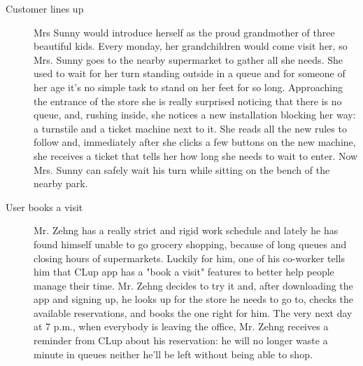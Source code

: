 \begin{description}
    \item[Customer lines up]
    Mrs Sunny would introduce herself as the proud grandmother of three beautiful kids.   
    Every monday, her grandchildren would come visit her, so  Mrs. Sunny goes to the nearby supermarket to gather all she needs. She used to wait for her turn standing outside in a queue and for someone of her age it's no simple task to stand on her feet for so long. Approaching the entrance of the store she is really surprised noticing that there is no queue, and, rushing inside, she notices a new installation blocking her way: a turnstile and a ticket machine next to it. She reads all the new rules to follow and, immediately after she clicks a few buttons on the new machine, she receives a ticket that tells her how long she needs to wait to enter. Now Mrs. Sunny can safely wait his turn while sitting on the bench of the nearby park. 


    \item[User books a visit]
    Mr. Zehng  has a really strict and rigid work schedule and lately he has found himself unable to go grocery shopping, because of long queues and closing hours of supermarkets. Luckily for him, one of his co-worker tells him that CLup app has a "book a visit" features to better help people manage their time. Mr. Zehng decides to try it and, after downloading the app and signing up, he looks up for the store he needs to go to, checks the available reservations, and books the one right for him. The very next day at 7 p.m., when everybody is leaving the office, Mr. Zehng receives a reminder from CLup about his reservation: he will no longer waste a minute in queues neither he'll be left without being able to shop.


\end{description}
